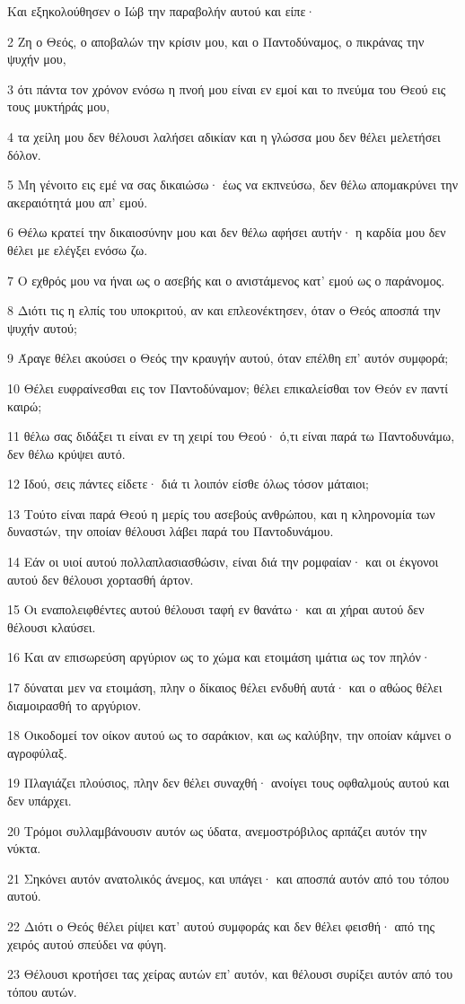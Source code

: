 \par Και εξηκολούθησεν ο Ιώβ την παραβολήν αυτού και είπε·
\par 2 Ζη ο Θεός, ο αποβαλών την κρίσιν μου, και ο Παντοδύναμος, ο πικράνας την ψυχήν μου,
\par 3 ότι πάντα τον χρόνον ενόσω η πνοή μου είναι εν εμοί και το πνεύμα του Θεού εις τους μυκτήράς μου,
\par 4 τα χείλη μου δεν θέλουσι λαλήσει αδικίαν και η γλώσσα μου δεν θέλει μελετήσει δόλον.
\par 5 Μη γένοιτο εις εμέ να σας δικαιώσω· έως να εκπνεύσω, δεν θέλω απομακρύνει την ακεραιότητά μου απ' εμού.
\par 6 Θέλω κρατεί την δικαιοσύνην μου και δεν θέλω αφήσει αυτήν· η καρδία μου δεν θέλει με ελέγξει ενόσω ζω.
\par 7 Ο εχθρός μου να ήναι ως ο ασεβής και ο ανιστάμενος κατ' εμού ως ο παράνομος.
\par 8 Διότι τις η ελπίς του υποκριτού, αν και επλεονέκτησεν, όταν ο Θεός αποσπά την ψυχήν αυτού;
\par 9 Άραγε θέλει ακούσει ο Θεός την κραυγήν αυτού, όταν επέλθη επ' αυτόν συμφορά;
\par 10 Θέλει ευφραίνεσθαι εις τον Παντοδύναμον; θέλει επικαλείσθαι τον Θεόν εν παντί καιρώ;
\par 11 θέλω σας διδάξει τι είναι εν τη χειρί του Θεού· ό,τι είναι παρά τω Παντοδυνάμω, δεν θέλω κρύψει αυτό.
\par 12 Ιδού, σεις πάντες είδετε· διά τι λοιπόν είσθε όλως τόσον μάταιοι;
\par 13 Τούτο είναι παρά Θεού η μερίς του ασεβούς ανθρώπου, και η κληρονομία των δυναστών, την οποίαν θέλουσι λάβει παρά του Παντοδυνάμου.
\par 14 Εάν οι υιοί αυτού πολλαπλασιασθώσιν, είναι διά την ρομφαίαν· και οι έκγονοι αυτού δεν θέλουσι χορτασθή άρτον.
\par 15 Οι εναπολειφθέντες αυτού θέλουσι ταφή εν θανάτω· και αι χήραι αυτού δεν θέλουσι κλαύσει.
\par 16 Και αν επισωρεύση αργύριον ως το χώμα και ετοιμάση ιμάτια ως τον πηλόν·
\par 17 δύναται μεν να ετοιμάση, πλην ο δίκαιος θέλει ενδυθή αυτά· και ο αθώος θέλει διαμοιρασθή το αργύριον.
\par 18 Οικοδομεί τον οίκον αυτού ως το σαράκιον, και ως καλύβην, την οποίαν κάμνει ο αγροφύλαξ.
\par 19 Πλαγιάζει πλούσιος, πλην δεν θέλει συναχθή· ανοίγει τους οφθαλμούς αυτού και δεν υπάρχει.
\par 20 Τρόμοι συλλαμβάνουσιν αυτόν ως ύδατα, ανεμοστρόβιλος αρπάζει αυτόν την νύκτα.
\par 21 Σηκόνει αυτόν ανατολικός άνεμος, και υπάγει· και αποσπά αυτόν από του τόπου αυτού.
\par 22 Διότι ο Θεός θέλει ρίψει κατ' αυτού συμφοράς και δεν θέλει φεισθή· από της χειρός αυτού σπεύδει να φύγη.
\par 23 Θέλουσι κροτήσει τας χείρας αυτών επ' αυτόν, και θέλουσι συρίξει αυτόν από του τόπου αυτών.

